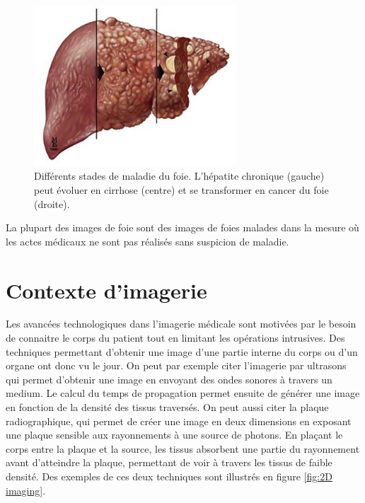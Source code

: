 
\begin{figure}
    \centering
    \includegraphics[height=6cm]{Images/Liver_cirrhosis_stages.jpg}
    \caption{Différents stades de maladie du foie. L'hépatite chronique (gauche) peut évoluer en cirrhose (centre) et se transformer en cancer du foie (droite)\protect \footnotemark.}
    \label{fig:unhealthy liver}
\end{figure}

La plupart des images de foie sont des images de foies malades dans la mesure où les actes médicaux ne sont pas réalisés sans suspicion de maladie.




\section{Contexte d'imagerie}
\label{sec:contexte:images}

Les avancées technologiques dans l'imagerie médicale sont motivées par le besoin de connaitre le corps du patient tout en limitant les opérations intrusives. Des techniques permettant d'obtenir une image d'une partie interne du corps ou d'un organe ont donc vu le jour. On peut par exemple citer l'imagerie par ultrasons qui permet d'obtenir une image en envoyant des ondes sonores à travers un medium. Le calcul du temps de propagation permet ensuite de générer une image en fonction de la densité des tissus traversés. On peut aussi citer la plaque radiographique, qui permet de créer une image en deux dimensions en exposant une plaque sensible aux rayonnements à une source de photons. En plaçant le corps entre la plaque et la source, les tissus absorbent une partie du rayonnement avant d'atteindre la plaque, permettant de voir à travers les tissus de faible densité. Des exemples de ces deux techniques sont illustrés en figure \ref{fig:2D imaging}.


